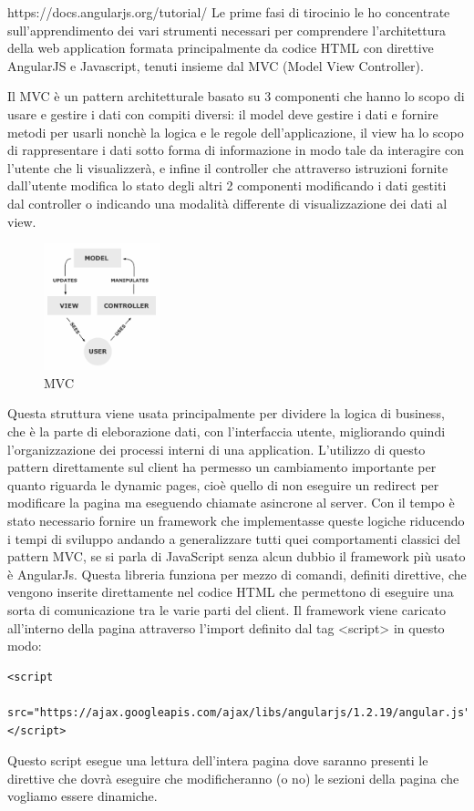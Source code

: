 https://docs.angularjs.org/tutorial/
\fi
Le prime fasi di tirocinio le ho concentrate sull'apprendimento dei vari strumenti necessari per comprendere l'architettura della web application formata principalmente da codice HTML con direttive AngularJS e Javascript, tenuti insieme dal MVC (Model View Controller).

Il MVC è un pattern architetturale basato su 3 componenti che hanno lo scopo di usare e gestire i dati con compiti diversi: il model deve gestire i dati e fornire metodi per usarli nonchè la logica e le regole dell'applicazione, il view ha lo scopo di rappresentare i dati sotto forma di informazione in modo tale da interagire con l'utente che li visualizzerà, e infine il controller che attraverso istruzioni fornite dall'utente modifica lo stato degli altri 2 componenti modificando i dati gestiti dal controller o indicando una modalità differente di visualizzazione dei dati al view.
\begin{figure}[H]
 \centering
  \includegraphics[width=0.3\textwidth]{img/MVC-Process.png}
 \caption{MVC}
 \end{figure}
Questa struttura viene usata principalmente per dividere la logica di business, che è la parte di eleborazione dati, con l'interfaccia utente, migliorando quindi l'organizzazione dei processi interni di una application.
L'utilizzo di questo pattern direttamente sul client ha permesso un cambiamento importante per quanto riguarda le dynamic pages, cioè quello di non eseguire un redirect per modificare la pagina ma eseguendo chiamate asincrone al server.
Con il tempo è stato necessario fornire un framework che implementasse queste logiche riducendo i tempi di sviluppo andando a generalizzare tutti quei comportamenti classici del pattern MVC, se si parla di JavaScript senza alcun dubbio il framework più usato è AngularJs.
Questa libreria funziona per mezzo di comandi, definiti direttive, che vengono inserite direttamente nel codice HTML che permettono di eseguire una sorta di comunicazione tra le varie parti del client. Il framework viene caricato all'interno della pagina attraverso l'import definito dal tag <script> in questo modo:
\begin{lstlisting}[language=betterHtml]
<script
 src="https://ajax.googleapis.com/ajax/libs/angularjs/1.2.19/angular.js">
</script>
\end{lstlisting}
Questo script esegue una lettura dell'intera pagina dove saranno presenti le direttive che dovrà eseguire che modificheranno (o no) le sezioni della pagina che vogliamo essere dinamiche.



